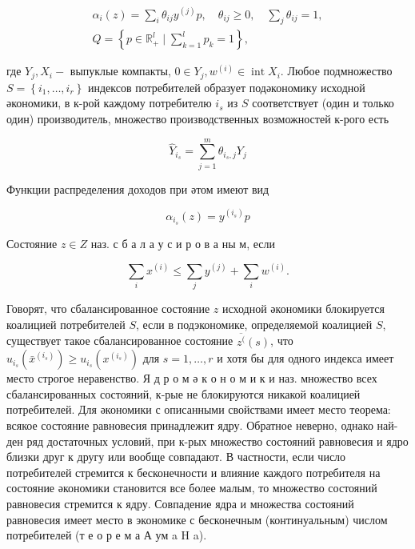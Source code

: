 \documentclass[10pt]{article}
\begin{document}
\[

\begin{gathered}

\alpha_{i}(z)=\sum_{i} \theta_{i j} y^{(j)} p, \quad \theta_{i j} \geqslant 0, \quad \sum_{j} \theta_{i j}=1, \\

Q=\left\{p \in \mathbb{R}_{+}^{l} \mid \sum_{k=1}^{l} p_{k}=1\right\},

\end{gathered}

\]



где $Y_{j}, X_{i}-$ выпуклые компакты, $0 \in Y_{j}, w^{(i)} \in \operatorname{int} X_{i}$. Любое подмножество $S=\left\{i_{1}, \ldots, i_{r}\right\}$ индексов потребителей образует подәкономику исходной әкономики, в к-рой каждому потребителю $i_{s}$ из $S$ соответствует (один и только один) производитель, множество производственных возможностей к-рого есть



\[

\hat{Y}_{i_{s}}=\sum_{j=1}^{m} \theta_{i_{s}, j} Y_{j}

\]



Функции распределения доходов при әтом имеют вид



\[

\alpha_{i_{s}}(z)=y^{\left(i_{s}\right)} p

\]



Состояние $z \in Z$ наз. с б а л а у с и р о в а ны м, если



\[

\sum_{i} x^{(i)} \leqslant \sum_{j} y^{(j)}+\sum_{i} w^{(i)} .

\]



Говорят, что сбалансированное состояние $z$ исходной әкономики блокируется коалицией потребителей $S$, если в подэкономике, определяемой коалицией $S$, существует такое сбалансированное состояние $\overline{z^{(}}(s)$, что $u_{i_{s}}\left(\bar{x}^{\left(i_{s}\right)}\right) \geqslant u_{i_{s}}\left(x^{\left(i_{s}\right)}\right)$ для $s=1, \ldots, r$ и хотя бы для одного индекса имеет место строгое неравенство. Я д р о м ә к о н о м и к и наз. множество всех сбалансированных состояний, к-рые не блокируются никакой коалицией потребителей. Для әкономики с описанными свойствами имеет место теорема: всякое состояние равновесия принадлежит ядру. Обратное неверно, однако най- ден ряд достаточных условий, при к-рых множество состояний равновесия и ядро близки друг к другу или вообще совпадают. В частности, если число потребителей стремится к бесконечности и влияние каждого потребителя на состояние әкономики становится все более малым, то множество состояний равновесия стремится к ядру. Совпадение ядра и множества состояний равновесия имеет место в экономике с бесконечным (континуальным) числом потребителей (т е о р е м а А ум a H a).
\end{document}
